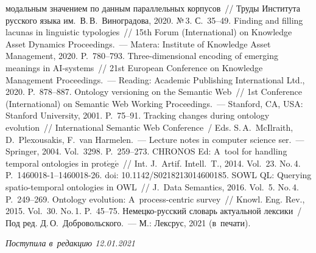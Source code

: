 \begin{multicols}{2}
{{\begin{thebibliography}{99}
модальным значением по данным параллельных корпусов~// Труды Института русского 
языка им.\ В.\,В.~Виноградова, 2020. №\,3. С.~35--49.
 Finding and filling lacunas in linguistic typologies~// 15th  Forum 
(International) on Knowledge Asset Dynamics Proceedings.~--- Matera: Institute of 
Knowledge Asset Management, 2020. P.~780--793.
 Three-dimensional encoding of emerging meanings in AI-systems~// 21st 
European Conference on Knowledge Management Proceedings.~--- Reading: Academic 
Publishing International Ltd., 2020. P.~878--887.
 Ontology versioning on the Semantic Web~// 1st  Conference 
(International)  on Semantic Web Working Proceedings.~--- Stanford, CA, USA: Stanford 
University, 2001. P.~75--91.
 Tracking changes during ontology evolution~// 
International Semantic Web Conference~/ Eds. S.\,A.~McIlraith, D.~Plexousakis, F.~van Harmelen.~--- 
Lecture notes in computer science ser.~--- Springer, 2004. Vol.~3298. P.~259--273.
 CHRONOS Ed: A~tool for handling 
temporal ontologies in prot$\acute{\mbox{e}}$g$\acute{\mbox{e}}$~// Int. J.~Artif. 
Intell.~T., 2014. Vol.~23. No.\,4. P.~1460018-1--1460018-26. doi: 
10.1142/S0218213014600185.
 SOWL QL: 
Querying spatio-temporal ontologies in OWL~// J.~Data Semantics, 2016. Vol.~5. No.\,4. 
P.~249--269.
 Ontology evolution: A~process-centric survey~// Knowl. 
Eng. Rev., 2015. Vol.~30. No.\,1. P.~45--75.
Немецко-русский словарь актуальной лексики~/ Под ред. Д.\,О.~Добровольского.~--- М.: 
Лексрус, 2021 (в~печати).
\end{thebibliography}

}
}

\end{multicols}

\vspace*{-6pt}

\hfill{\small\textit{Поступила в~редакцию 12.01.2021}}



\newpage

\vspace*{-28pt}

